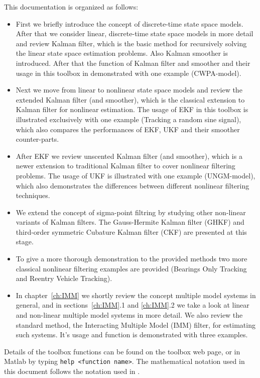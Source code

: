 This documentation is organized as follows: 
\begin{itemize}

\item First we briefly introduce the concept of discrete-time state
  space models. After that we consider linear, discrete-time state
  space models in more detail and review Kalman filter, which is the
  basic method for recursively solving the linear state space
  estimation problems. Also Kalman smoother is introduced. After that
  the function of Kalman filter and smoother and their usage in this
  toolbox in demonstrated with one example (CWPA-model).

\item Next we move from linear to nonlinear state space models and
  review the extended Kalman filter (and smoother), which is the
  classical extension to Kalman filter for nonlinear estimation. The
  usage of EKF in this toolbox is illustrated exclusively with one
  example (Tracking a random sine signal), which also compares the
  performances of EKF, UKF and their smoother counter-parts.

\item After EKF we review unscented Kalman filter (and smoother),
  which is a newer extension to traditional Kalman filter to cover
  nonlinear filtering problems. The usage of UKF is illustrated with
  one example (UNGM-model), which also demonstrates the differences
  between different nonlinear filtering techniques.

\item We extend the concept of sigma-point filtring by studying
  other non-linear variants of Kalman filters. The Gauss-Hermite
  Kalman filter (GHKF) and third-order symmetric Cubature Kalman
  filter (CKF) are presented at this stage.

\item To give a more thorough demonstration to the provided methods
  two more classical nonlinear filtering examples are provided
  (Bearings Only Tracking and Reentry Vehicle Tracking).

\item In chapter~\ref{ch:IMM} we shortly review the concept multiple model
  systems in general, and in sections~\ref{ch:IMM}.1 and \ref{ch:IMM}.2 we take a look at
  linear and non-linear multiple model systems in more detail. We also
  review the standard method, the Interacting Multiple Model (IMM)
  filter, for estimating such systems. It's usage and function is
  demonstrated with three examples.


\end{itemize}

Details of the toolbox functions can be found on the toolbox web page, or in
Matlab by typing \texttt{help <function name>}. The mathematical notation used in this document follows the notation used in \citep{Sarkka:2006}.


